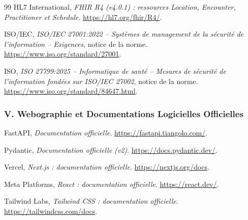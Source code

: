 \begin{thebibliography}{99}
HL7 International,
\newblock \emph{FHIR R4 (v4.0.1) : ressources Location, Encounter, Practitioner et Schedule}.
\newblock \url{https://hl7.org/fhir/R4/}.

ISO/IEC,
\newblock \emph{ISO/IEC 27001:2022 -- Systèmes de management de la sécurité de l'information -- Exigences},
\newblock notice de la norme.
\newblock \url{https://www.iso.org/standard/27001}.

ISO,
\newblock \emph{ISO 27799:2025 -- Informatique de santé -- Mesures de sécurité de l'information fondées sur ISO/IEC 27002},
\newblock notice de la norme.
\newblock \url{https://www.iso.org/standard/84647.html}.

\subsubsection*{V. Webographie et Documentations Logicielles Officielles}

FastAPI,
\newblock \emph{Documentation officielle}.
\newblock \url{https://fastapi.tiangolo.com/}.

Pydantic,
\newblock \emph{Documentation officielle (v2)}.
\newblock \url{https://docs.pydantic.dev/}.

Vercel,
\newblock \emph{Next.js : documentation officielle}.
\newblock \url{https://nextjs.org/docs}.

Meta Platforms,
\newblock \emph{React : documentation officielle}.
\newblock \url{https://react.dev/}.

Tailwind Labs,
\newblock \emph{Tailwind CSS : documentation officielle}.
\newblock \url{https://tailwindcss.com/docs}.

\end{thebibliography}
